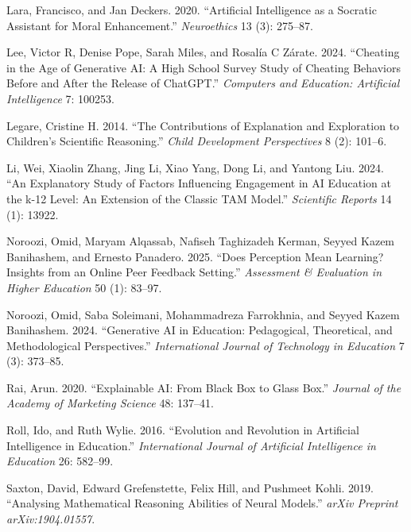 \documentclass[
  12pt,
]{article}
\newlength{\cslhangindent}
\newenvironment{CSLReferences}[2] %
 {\begin{list}{}{%
  \setlength{\itemindent}{0pt}
  \setlength{\leftmargin}{0pt}
  \setlength{\parsep}{0pt}
  \ifodd #1
   \setlength{\leftmargin}{\cslhangindent}
   \setlength{\itemindent}{-1\cslhangindent}
  \fi
  \setlength{\itemsep}{#2\baselineskip}}}
 {\end{list}}
\begin{document}
\begin{CSLReferences}{1}{0}
Lara, Francisco, and Jan Deckers. 2020. {``Artificial Intelligence as a Socratic Assistant for Moral Enhancement.''} \emph{Neuroethics} 13 (3): 275--87.

Lee, Victor R, Denise Pope, Sarah Miles, and Rosalía C Zárate. 2024. {``Cheating in the Age of Generative AI: A High School Survey Study of Cheating Behaviors Before and After the Release of ChatGPT.''} \emph{Computers and Education: Artificial Intelligence} 7: 100253.

Legare, Cristine H. 2014. {``The Contributions of Explanation and Exploration to Children's Scientific Reasoning.''} \emph{Child Development Perspectives} 8 (2): 101--6.

Li, Wei, Xiaolin Zhang, Jing Li, Xiao Yang, Dong Li, and Yantong Liu. 2024. {``An Explanatory Study of Factors Influencing Engagement in AI Education at the k-12 Level: An Extension of the Classic TAM Model.''} \emph{Scientific Reports} 14 (1): 13922.

Noroozi, Omid, Maryam Alqassab, Nafiseh Taghizadeh Kerman, Seyyed Kazem Banihashem, and Ernesto Panadero. 2025. {``Does Perception Mean Learning? Insights from an Online Peer Feedback Setting.''} \emph{Assessment \& Evaluation in Higher Education} 50 (1): 83--97.

Noroozi, Omid, Saba Soleimani, Mohammadreza Farrokhnia, and Seyyed Kazem Banihashem. 2024. {``Generative AI in Education: Pedagogical, Theoretical, and Methodological Perspectives.''} \emph{International Journal of Technology in Education} 7 (3): 373--85.

Rai, Arun. 2020. {``Explainable AI: From Black Box to Glass Box.''} \emph{Journal of the Academy of Marketing Science} 48: 137--41.

Roll, Ido, and Ruth Wylie. 2016. {``Evolution and Revolution in Artificial Intelligence in Education.''} \emph{International Journal of Artificial Intelligence in Education} 26: 582--99.

Saxton, David, Edward Grefenstette, Felix Hill, and Pushmeet Kohli. 2019. {``Analysing Mathematical Reasoning Abilities of Neural Models.''} \emph{arXiv Preprint arXiv:1904.01557}.


\end{CSLReferences}
\end{document}
